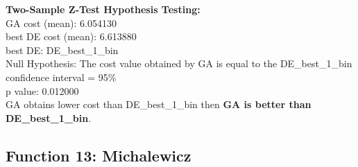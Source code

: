 \documentclass[12pt]{article}
\begin{document}
\noindent
\textbf{Two-Sample Z-Test Hypothesis Testing:}\\
GA cost (mean): 6.054130\\
best DE cost (mean): 6.613880\\
best DE: DE\_best\_1\_bin\\
Null Hypothesis: The cost value obtained by GA is equal to the DE\_best\_1\_bin\\
confidence interval = 95\%\\
p value: 0.012000\\
GA obtains lower cost than DE\_best\_1\_bin then \textbf{GA is better than DE\_best\_1\_bin}.\\


\subsection{Function 13: Michalewicz}
\end{document}
